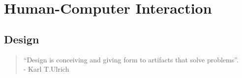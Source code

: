 \section{Human-Computer Interaction}
\label{sec:hcitheory}
\subsection{Design}
\begin{quotation}
 ``Design is conceiving and giving form to artifacts that solve problems''. \\
 - Karl T.Ulrich
\end{quotation}
 


